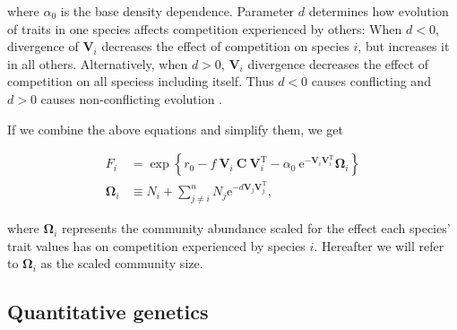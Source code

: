 \noindent where $\alpha_0$ is the base density dependence.
Parameter $d$ determines how evolution of traits in one species affects competition
experienced by others: When $d < 0$, divergence of $\mathbf{V}_i$ decreases the
effect of competition on species $i$, but increases it in all others.
Alternatively, when $d > 0$, $\mathbf{V}_i$ divergence decreases the effect of
competition on all speciess including itself.
Thus $d < 0$ causes conflicting and $d > 0$ causes non-conflicting evolution
\citep{Northfield:2013if}.


If we combine the above equations and simplify them, we get

\begin{equation} \label{eq:fitness-full}
\begin{split}
    F_{i} &= \exp \left\{
        r_0 - f ~ \mathbf{V}_i ~ \mathbf{C} ~ \mathbf{V}_{i}^{\textrm{T}} -
        \alpha_0 ~\textrm{e}^{- \mathbf{V}_i \mathbf{V}_i^{\textrm{T}} } \mathbf{\Omega}_{i}
        \right\} \\
        \mathbf{\Omega}_i &\equiv N_i +
            \sum_{j \ne i}^{n}{ N_j \textrm{e}^{ -d \mathbf{V}_j \mathbf{V}_j^{\textrm{T}} } }
        \textrm{,}
\end{split}
\end{equation}

\noindent where $\mathbf{\Omega}_i$ represents the community abundance scaled
for the effect each species' trait values has on competition
experienced by species $i$.
Hereafter we will refer to $\mathbf{\Omega}_i$ as the scaled community size.




%


\subsection*{Quantitative genetics}

